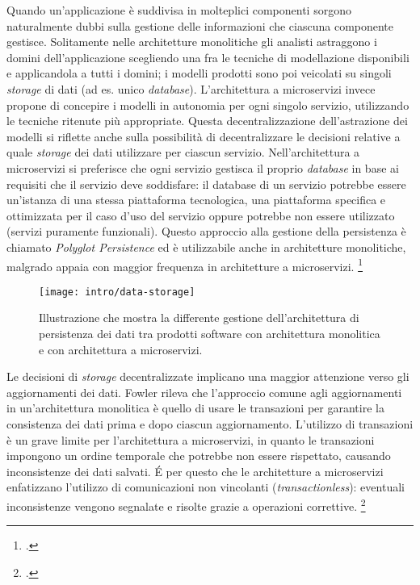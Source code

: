Quando un'applicazione è suddivisa in molteplici componenti sorgono naturalmente dubbi sulla gestione delle informazioni che ciascuna componente gestisce.
Solitamente nelle architetture monolitiche gli analisti astraggono i domini dell'applicazione scegliendo una fra le tecniche di modellazione disponibili e applicandola a tutti i domini;
i modelli prodotti sono poi veicolati su singoli \emph{storage} di dati (ad es. unico \emph{database}).
L'architettura a microservizi invece propone di concepire i modelli in autonomia per ogni singolo servizio, utilizzando le tecniche ritenute più appropriate.
Questa decentralizzazione dell'astrazione dei modelli si riflette anche sulla possibilità di decentralizzare le decisioni relative a quale \emph{storage} dei dati utilizzare per ciascun servizio.
Nell'architettura a microservizi si preferisce che ogni servizio gestisca il proprio \emph{database} in base ai requisiti che il servizio deve soddisfare: il database di un servizio potrebbe essere un'istanza di una stessa piattaforma tecnologica, una piattaforma specifica e ottimizzata per il caso d'uso del servizio oppure potrebbe non essere utilizzato (servizi puramente funzionali).
Questo approccio alla gestione della persistenza è chiamato \emph{Polyglot Persistence} ed è utilizzabile anche in architetture monolitiche, malgrado appaia con maggior frequenza in architetture a microservizi.
\footcite{site:fowler-microservices}

\begin{figure}[H]
    \centering
    \texttt{[image: intro/data-storage]}
    \caption{Illustrazione che mostra la differente gestione dell'architettura di persistenza dei dati tra prodotti software con architettura monolitica e con architettura a microservizi.\\ \cite{site:fowler-microservices}}
    \label{fig:data-storage}
\end{figure}

Le decisioni di \emph{storage} decentralizzate implicano una maggior attenzione verso gli aggiornamenti dei dati.
Fowler rileva che l'approccio comune agli aggiornamenti in un'architettura monolitica è quello di usare le transazioni per garantire la consistenza dei dati prima e dopo ciascun aggiornamento.
L'utilizzo di transazioni è un grave limite per l'architettura a microservizi, in quanto le transazioni impongono un ordine temporale che potrebbe non essere rispettato, causando inconsistenze dei dati salvati.
É per questo che le architetture a microservizi enfatizzano l'utilizzo di comunicazioni non vincolanti (\emph{transactionless}): eventuali inconsistenze vengono segnalate e risolte grazie a operazioni correttive.
\footcite{site:fowler-microservices}

